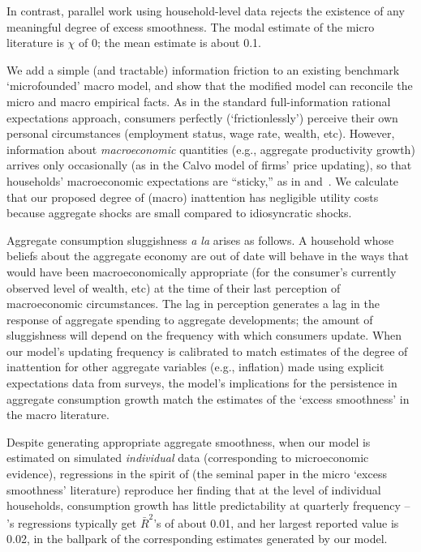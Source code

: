 \documentclass[titlepage]{./econtex}
\begin{document}
In contrast, parallel work using household-level data rejects the existence of any meaningful degree of excess smoothness.  The modal estimate of the micro literature is $\chi$ of 0; the mean estimate is about 0.1. 


We add a simple (and tractable) information friction to an existing benchmark `microfounded' macro model, and show that the modified model can reconcile the micro and macro empirical facts. As in the standard full-information rational expectations approach, consumers perfectly (`frictionlessly') perceive their own personal circumstances (employment status, wage rate, wealth, etc). However, information about \textit{macroeconomic} quantities (e.g., aggregate productivity growth) arrives only occasionally (as in the Calvo model of firms' price updating), so that households' macroeconomic expectations are ``sticky,'' as in \cite{mrSlumps} and~\cite{carroll:epidemicinflQJE}. We calculate that our proposed degree of (macro) inattention has negligible utility costs because aggregate shocks are small compared to idiosyncratic shocks.

Aggregate consumption sluggishness \textit{a la} \cite{cdSmooth} arises as follows.  A household whose beliefs about the aggregate economy are out of date will behave in the ways that would have been macroeconomically appropriate (for the consumer's currently observed level of wealth, etc) at the time of their last perception of macroeconomic circumstances.  The lag in perception generates a lag in the response of aggregate spending to aggregate developments; the amount of sluggishness will depend on the frequency with which consumers update.  When our model's updating frequency is calibrated to match estimates of the degree of inattention for other aggregate variables (e.g., inflation) made using explicit expectations data from surveys, the model's implications for the persistence in aggregate consumption growth match the estimates of the `excess smoothness' in the macro literature. 

\hypertarget{dynanR2}{}
\hypertarget{Excess-Sesitivity-Flag}{} 

Despite generating appropriate aggregate smoothness, when our model is estimated on simulated \emph{individual} data (corresponding to microeconomic evidence), regressions in the spirit of  \cite{dynanHabits} (the seminal paper in the micro `excess smoothness' literature) reproduce her finding that at the level of individual households, consumption growth has little predictability at quarterly frequency -- \cite{dynanHabits}'s regressions typically get $\bar{R}^{2}$'s of about 0.01, and her largest reported value is 0.02, in the ballpark of the corresponding estimates generated by our model.
 
\end{document}
